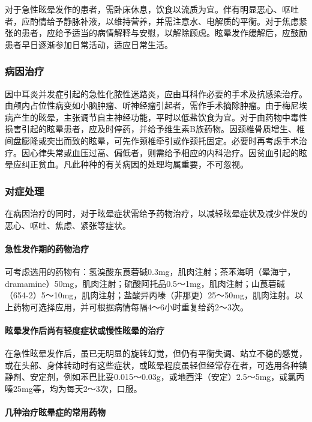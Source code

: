 对于急性眩晕发作的患者，需卧床休息，饮食以流质为宜。伴有明显恶心、呕吐者，应酌情给予静脉补液，以维持营养，并需注意水、电解质的平衡。对于焦虑紧张的患者，应给予适当的病情解释与安慰，以解除顾虑。眩晕发作缓解后，应鼓励患者早日逐渐参加日常活动，适应日常生活。

\subsubsection{病因治疗}

因中耳炎并发症引起的急性化脓性迷路炎，应由耳科作必要的手术及抗感染治疗。由颅内占位性病变如小脑肿瘤、听神经瘤引起者，需作手术摘除肿瘤。由于梅尼埃病产生的眩晕，主张调节自主神经功能，平时以低盐饮食为宜。对于由药物中毒性损害引起的眩晕患者，应及时停药，并给予维生素B族药物。因颈椎骨质增生、椎间盘膨隆或突出而致的眩晕，可先作颈椎牵引或作颈托固定。必要时再考虑手术治疗。因心律失常或血压过高、偏低者，则需给予相应的内科治疗。因贫血引起的眩晕应纠正贫血。凡此种种的有关病因的处理均属重要，不可忽视。

\subsubsection{对症处理}

在病因治疗的同时，对于眩晕症状需给予药物治疗，以减轻眩晕症状及减少伴发的恶心、呕吐、焦虑、紧张等症状。

\paragraph{急性发作期的药物治疗}

可考虑选用的药物有：氢溴酸东莨菪碱0.3mg，肌肉注射；茶苯海明（晕海宁，dramamine）50mg，肌肉注射；硫酸阿托品0.5～1mg，肌肉注射；山莨菪碱（654-2）5～10mg，肌肉注射；盐酸异丙嗪（非那更）25～50mg，肌肉注射。以上药物可选择应用，并可根据病情每隔4～6小时重复给药2～3次。

\paragraph{眩晕发作后尚有轻度症状或慢性眩晕的治疗}

在急性眩晕发作后，虽已无明显的旋转幻觉，但仍有平衡失调、站立不稳的感觉，或在头部、身体转动时有这些症状，或眩晕程度虽轻但经常存在者，可选用各种镇静剂、安定剂，例如苯巴比妥0.015～0.03g，或地西泮（安定）2.5～5mg，或氯丙嗪25mg等，均为每天2～3次，口服。

\paragraph{几种治疗眩晕症的常用药物}

